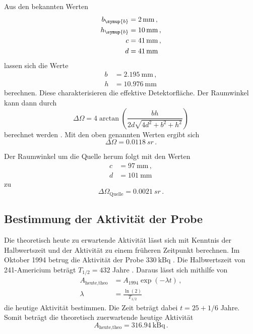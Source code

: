 Aus den bekannten Werten \cite{Versuchsanleitung}
\begin{align*}
  b_{\symup{b}} &= \SI{2}{\milli\meter} \,, \\
  h_{\symup{b}} &= \SI{10}{\milli\meter} \,, \\
  c &= \SI{41}{\milli\meter} \,,\\
  d &= \SI{41}{\milli\meter}
\end{align*}
lassen sich die Werte
\begin{align*}
  b &= \SI{2.195}{\milli\meter} \,,\\
  h &= \SI{10.976}{\milli\meter}
\end{align*}
berechnen. Diese charakterisieren die effektive Detektorfläche. Der Raumwinkel kann dann durch
\begin{equation}
  \Delta \Omega = 4 \arctan\left(\frac{b h}{2d \sqrt{4d^2 + b^2 + h^2}}\right)
\end{equation}
berechnet werden \cite{raumwinkel}. Mit den oben genannten Werten ergibt sich
\begin{equation*}
  \Delta \Omega = \SI{0.0118}{sr} \,.
\end{equation*}

Der Raumwinkel um die Quelle herum folgt mit den Werten \cite{Versuchsanleitung}
\begin{align*}
  c &= \SI{97}{\milli\meter} \,, \\
  d &= \SI{101}{\milli\meter}
\end{align*}
zu
\begin{equation*}
  \Delta \Omega_\text{Quelle} = \SI{0.0021}{sr} \,.
\end{equation*}

\newpage
\subsection{Bestimmung der Aktivität der Probe}
\label{subsec:aktivitaet}

Die theoretisch heute zu erwartende Aktivität lässt sich mit Kenntnis der Halbwertszeit
und der Aktivität zu einem früheren Zeitpunkt berechnen. Im Oktober 1994 betrug die
Aktivität der Probe $\SI{330}{\kilo\becquerel}$ \cite{Versuchsanleitung}. Die Halbwertszeit
von 241-Americium beträgt $T_{1/2}=432$ Jahre \cite{t12}. Daraus lässt sich mithilfe von
\begin{align*}
  A_{\text{heute,theo}}&= A_{1994}\exp(-\lambda t) \,, \\
  \lambda&= \frac{\ln(2)}{T_{1/2}}
\end{align*}
die heutige Aktivität bestimmen. Die Zeit beträgt dabei $t=25+1/6$ Jahre. Somit beträgt die
theoretisch zuerwartende heutige Aktivität
\begin{equation*}
  A_{\text{heute,theo}}= \SI{316.94}{\kilo\becquerel} \,.
\end{equation*}

